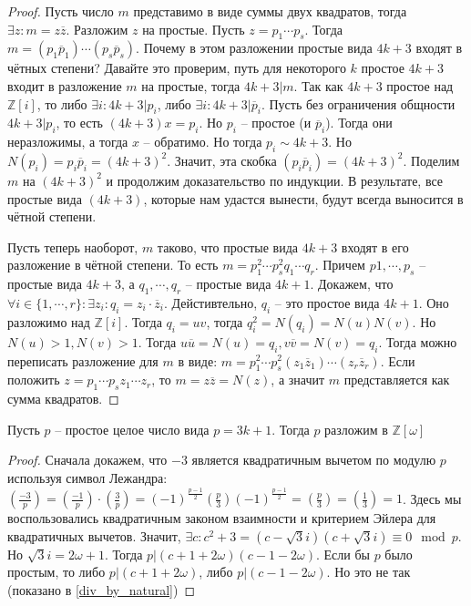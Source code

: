 \documentclass{article}
\begin{document}
\begin{proof}
    Пусть число $m$ представимо в виде суммы двух квадратов, тогда $\exists z: m = z \overline z$. Разложим $z$ на
    простые. Пусть $z = p_1 \cdots p_s$. Тогда $m = (p_1 \overline p_1) \cdots (p_s \overline p_s)$. Почему в этом
    разложении простые вида $4k+3$ входят в чётных степени? Давайте это проверим, путь для некоторого $k$ простое $4k+3$
    входит в разложение $m$ на простые,
    тогда $4k+3|m$. Так как $4k+3$ простое над $\mathbb{Z}[i]$, то либо $\exists i: 4k+3|p_i$, либо $\exists i: 4k+3|\overline p_i$.
    Пусть без
    ограничения общности $4k+3|p_i$, то есть $(4k+3)x = p_i$. Но $p_i$ -- простое (и $\overline p_i$). Тогда они
    неразложимы, а тогда $x$ -- обратимо. Но тогда $p_i \sim 4k+3$. Но $N(p_i) = p_i \overline p_i = (4k+3)^2$. Значит,
    эта скобка $(p_i \overline p_i) = (4k+3)^2$. Поделим $m$ на $(4k+3)^2$ и продолжим доказательство по индукции. В
    результате, все простые вида $(4k+3)$, которые нам удастся вынести, будут всегда выносится в чётной степени. 

    Пусть теперь наоборот, $m$ таково, что простые вида $4k+3$ входят в его разложение в чётной степени. То есть $m =
    p_1^2 \cdots p_s^2 q_1 \cdots q_r$. Причем $p1, \cdots, p_s$ -- простые вида $4k+3$, а $q_1, \cdots, q_r$ -- простые
    вида $4k+1$. Докажем, что $\forall i \in \{1, \cdots, r\}: \exists z_i: q_i = z_i \cdot \overline z_i$.
    Дейстивтельно, $q_i$ -- это простое вида $4k+1$. Оно разложимо над $\mathbb{Z}[i]$. Тогда $q_i = uv$, тогда $q_i^2 =
    N(q_i) = N(u)N(v)$. Но $N(u) > 1, N(v) > 1$. Тогда $u \overline u = N(u) = q_i, v \overline v = N(v) = q_i$. Тогда
    можно переписать разложение для $m$ в виде: $m = p_1^2 \cdots p_s^2 (z_1 \overline z_1) \cdots (z_r \overline z_r)$.
    Если положить $z = p_1 \cdots p_s z_1 \cdots z_r$, то $m = z \overline z = N(z)$, а значит $m$ представляется как сумма
    квадратов.
\end{proof}

\begin{statement}
    Пусть $p$ -- простое целое число вида $p = 3k+1$. Тогда $p$ разложим в $\mathbb{Z}[\omega]$
\end{statement}

\begin{proof}
    Сначала докажем, что $-3$ является квадратичным вычетом по модулю $p$ используя символ Лежандра:
    $\left(\frac{-3}{p}\right) = \left(\frac{-1}{p}\right) \cdot \left( \frac{3}{p} \right) =
    (-1)^{\frac{p - 1}{2}} \left( \frac{p}{3} \right) (-1)^{\frac{p - 1}{2}} = \left( \frac{p}{3} \right) = \left(
    \frac{1}{3} \right) = 1$. Здесь мы воспользовались квадратичным законом взаимности и критерием Эйлера для
    квадратичных вычетов. Значит, $\exists c: c^2 + 3 = (c - \sqrt{3}i)(c + \sqrt{3}i) \equiv 0 \mod p$. Но
    $\sqrt{3}i = 2 \omega + 1$. Тогда $p | (c + 1 + 2 \omega)(c - 1 - 2\omega)$. Если бы $p$ было простым, то либо $p|(c
    + 1 + 2\omega)$, либо $p|(c - 1 - 2\omega)$. Но это не так (показано в \ref{div_by_natural})
\end{proof}
\end{document}

